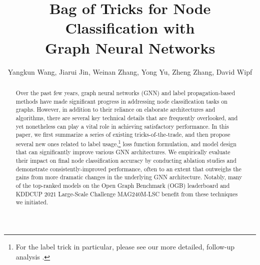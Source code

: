 \documentclass[sigconf,screen,nonacm]{acmart} \usepackage{booktabs}
\begin{document}
\sloppy


\title{Bag of Tricks for Node Classification with\\Graph Neural Networks}
\author{Yangkun Wang, Jiarui Jin, Weinan Zhang, Yong Yu, Zheng Zhang, David Wipf}
\renewcommand{\shorttitle}{Bag of Tricks for Node Classification with Graph Neural Networks}
\renewcommand{\shortauthors}{Y. Wang, et al.}

\begin{abstract}
Over the past few years, graph neural networks (GNN) and label propagation-based methods have made significant progress in addressing node classification tasks on graphs.  However, in addition to their reliance on elaborate architectures and algorithms, there are several key technical details that are frequently overlooked, and yet nonetheless can play a vital role in achieving satisfactory performance.  In this paper, we first summarize a series of existing tricks-of-the-trade, and then propose several new ones related to label usage,\footnote{For the label trick in particular, please see our more detailed, follow-up analysis \cite{wang2021why}.} loss function formulation, and model design that can significantly improve various GNN architectures.  We empirically evaluate their impact on final node classification accuracy by conducting ablation studies and demonstrate consistently-improved performance, often to an extent that outweighs the gains from more dramatic changes in the underlying GNN architecture.  Notably, many of the top-ranked models on the Open Graph Benchmark (OGB) leaderboard and KDDCUP 2021 Large-Scale Challenge MAG240M-LSC benefit from these techniques we initiated.
\end{abstract}

\maketitle
{
\renewcommand{\thefootnote}{\fnsymbol{footnote}}
}
\end{document}
